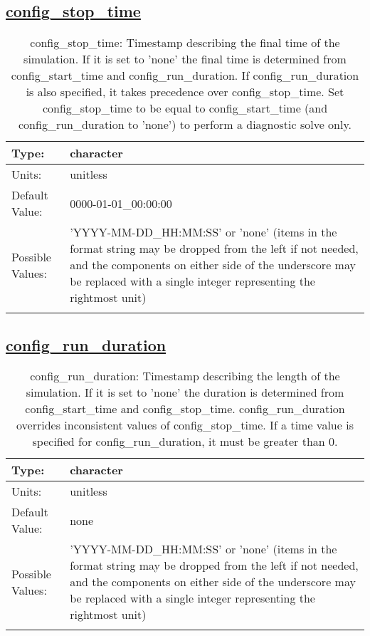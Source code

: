 \subsection[config\_stop\_time]{\hyperref[sec:nm_tab_time_management]{config\_stop\_time}}
\label{subsec:nm_sec_config_stop_time}
\begin{center}
\begin{longtable}{| p{2.0in} || p{4.0in} |}
    \hline
    Type: & character \\
    \hline
    Units: & \si{unitless} \\
    \hline
    Default Value: & 0000-01-01\_00:00:00 \\
    \hline
    Possible Values: & 'YYYY-MM-DD\_HH:MM:SS' or 'none' (items in the format string may be dropped from the left if not needed, and the components on either side of the underscore may be replaced with a single integer representing the rightmost unit) \\
    \hline
    \caption{config\_stop\_time: Timestamp describing the final time of the simulation. If it is set to 'none' the final time is determined from config\_start\_time and config\_run\_duration.  If config\_run\_duration is also specified, it takes precedence over config\_stop\_time.  Set config\_stop\_time to be equal to config\_start\_time (and config\_run\_duration to 'none') to perform a diagnostic solve only.}
\end{longtable}
\end{center}
\subsection[config\_run\_duration]{\hyperref[sec:nm_tab_time_management]{config\_run\_duration}}
\label{subsec:nm_sec_config_run_duration}
\begin{center}
\begin{longtable}{| p{2.0in} || p{4.0in} |}
    \hline
    Type: & character \\
    \hline
    Units: & \si{unitless} \\
    \hline
    Default Value: & none \\
    \hline
    Possible Values: & 'YYYY-MM-DD\_HH:MM:SS' or 'none' (items in the format string may be dropped from the left if not needed, and the components on either side of the underscore may be replaced with a single integer representing the rightmost unit) \\
    \hline
    \caption{config\_run\_duration: Timestamp describing the length of the simulation. If it is set to 'none' the duration is determined from config\_start\_time and config\_stop\_time. config\_run\_duration overrides inconsistent values of config\_stop\_time. If a time value is specified for config\_run\_duration, it must be greater than 0.}
\end{longtable}
\end{center}
